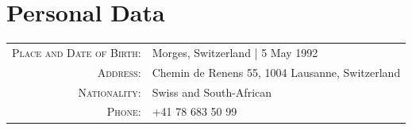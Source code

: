 \documentclass[a4paper,11pt]{article} %
\begin{document}



\section{Personal Data}
\begin{center}
\begin{tabular}{rl}
\textsc{Place and Date of Birth:} & Morges, Switzerland  | 5 May 1992 \\
\textsc{Address:} & Chemin de Renens 55, 1004 Lausanne, Switzerland \\
\textsc{Nationality:} & Swiss and South-African \\
\textsc{Phone:} & +41 78 683 50 99\\
\end{tabular}
\end{center}
\end{document}
